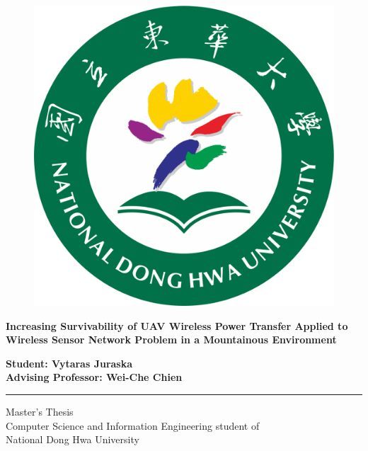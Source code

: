 \documentclass[11pt,a4paper,footinclude=true,headinclude=true, oneside]{scrbook}
\begin{document}
\begin{titlepage}
    \begin{center}
        \vspace*{1cm}
        \begin{figure}[htbp]
            \centerline{\includegraphics[scale=.5]{ndhu_logo.png}}
        \end{figure}
        {\fontsize{16}{16}\selectfont
            \textbf{Increasing Survivability of UAV Wireless Power Transfer Applied to Wireless Sensor Network Problem in a Mountainous Environment}
        }
        
        \vfill
        \textbf{Student: Vytaras Juraska} \\
        \textbf{Advising Professor: Wei-Che Chien}
        \par\noindent\rule{\textwidth}{0.8pt}
        Master's Thesis\\
        Computer Science and Information Engineering student of\\
        National Dong Hwa University\\
            
    \end{center}
\end{titlepage}

\end{document}
